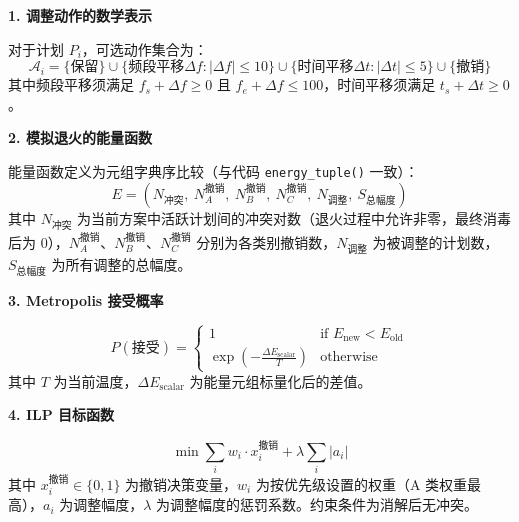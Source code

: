 
\textbf{1. 调整动作的数学表示}

对于计划 $P_i$，可选动作集合为：
\begin{equation}
    \mathcal{A}_i = \{\text{保留}\} \cup \{\text{频段平移} \Delta f : |\Delta f| \leq 10\} \cup \{\text{时间平移} \Delta t : |\Delta t| \leq 5\} \cup \{\text{撤销}\}
\end{equation}
其中频段平移须满足 $f_s + \Delta f \geq 0$ 且 $f_e + \Delta f \leq 100$，时间平移须满足 $t_s + \Delta t \geq 0$。

\textbf{2. 模拟退火的能量函数}

能量函数定义为元组字典序比较（与代码 \texttt{energy\_tuple()} 一致）：
\begin{equation}
    E = (N_{\text{冲突}},\ N_A^{\text{撤销}},\ N_B^{\text{撤销}},\ N_C^{\text{撤销}},\ N_{\text{调整}},\ S_{\text{总幅度}})
\end{equation}
其中 $N_{\text{冲突}}$ 为当前方案中活跃计划间的冲突对数（退火过程中允许非零，最终消毒后为 0），$N_A^{\text{撤销}}$、$N_B^{\text{撤销}}$、$N_C^{\text{撤销}}$ 分别为各类别撤销数，$N_{\text{调整}}$ 为被调整的计划数，$S_{\text{总幅度}}$ 为所有调整的总幅度。

\textbf{3. Metropolis 接受概率}

\begin{equation}
    P(\text{接受}) = \begin{cases}
        1 & \text{if } E_{\text{new}} < E_{\text{old}} \\
        \exp\left(-\frac{\Delta E_{\text{scalar}}}{T}\right) & \text{otherwise}
    \end{cases}
\end{equation}
其中 $T$ 为当前温度，$\Delta E_{\text{scalar}}$ 为能量元组标量化后的差值。

\textbf{4. ILP 目标函数}

\begin{equation}
    \min \sum_{i} w_i \cdot x_i^{\text{撤销}} + \lambda \sum_{i} |a_i|
\end{equation}
其中 $x_i^{\text{撤销}} \in \{0,1\}$ 为撤销决策变量，$w_i$ 为按优先级设置的权重（A 类权重最高），$a_i$ 为调整幅度，$\lambda$ 为调整幅度的惩罚系数。约束条件为消解后无冲突。
